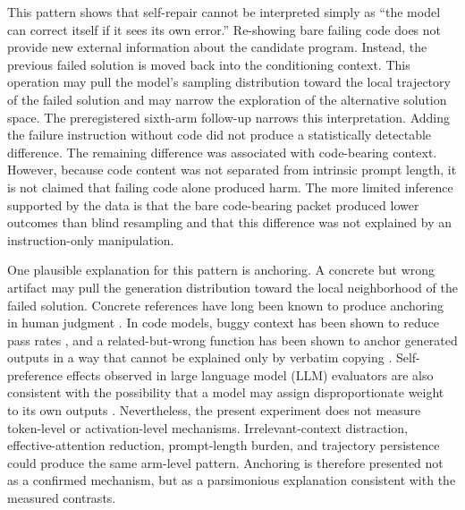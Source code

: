 \documentclass{article}
\numberwithin{equation}{section}  %
\theoremstyle{definition}
\begin{document}
This pattern shows that self-repair cannot be interpreted simply as ``the model can correct
itself if it sees its own error.'' Re-showing bare failing code does not provide new external
information about the candidate program. Instead, the previous failed solution is moved back
into the conditioning context. This operation may pull the model's sampling distribution
toward the local trajectory of the failed solution and may narrow the exploration of the
alternative solution space. The preregistered sixth-arm follow-up narrows this interpretation.
Adding the failure instruction without code did not produce a statistically detectable
difference. The remaining difference was associated with code-bearing context. However,
because code content was not separated from intrinsic prompt length, it is not claimed that
failing code alone produced harm. The more limited inference supported by the data is that the
bare code-bearing packet produced lower outcomes than blind resampling and that this difference
was not explained by an instruction-only manipulation.

One plausible explanation for this pattern is anchoring. A concrete but wrong artifact may
pull the generation distribution toward the local neighborhood of the failed solution.
Concrete references have long been known to produce anchoring in human judgment
\citep{tversky1974judgment}. In code models, buggy context has been shown to reduce pass rates
\citep{dinh2023bugs}, and a related-but-wrong function has been shown to anchor generated
outputs in a way that cannot be explained only by verbatim copying
\citep{jones2022cognitivebiases}. Self-preference effects observed in large language model
(LLM) evaluators are also consistent with the possibility that a model may assign
disproportionate weight to its own outputs \citep{panickssery2024selfrecognition}. Nevertheless,
the present experiment does not measure token-level or activation-level mechanisms.
Irrelevant-context distraction, effective-attention reduction, prompt-length burden, and
trajectory persistence could produce the same arm-level pattern. Anchoring is therefore
presented not as a confirmed mechanism, but as a parsimonious explanation consistent with the
measured contrasts.
\end{document}
